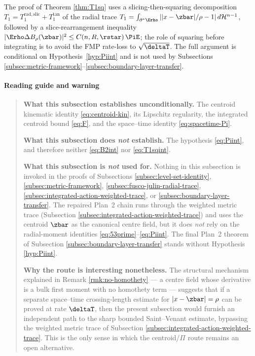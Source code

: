 \noindent
The proof of Theorem \ref{thm:T1sq} uses a slicing-then-squaring
decomposition $T_{1}=T_{1}^{\mathrm{rad,slic}}+T_{1}^{\mathrm{tan}}$
of the radial trace
$T_{1}=\int_{\partial^{*}\Erho}||x-\zbar|/\rho-1|\,d\mathcal H^{n-1}$,
followed by a slice-rearrangement inequality
$|\Erho\Delta B_{\rho}(\zbar)|^{2}\le C(n,R,\rstar)\,\PiE$;
the role of squaring before
integrating is to avoid the FMP rate-loss to $\sqrt{\deltaT}$.
The full argument is conditional on Hypothesis~\ref{hyp:Piint} and is
not used by Subsections
\ref{subsec:metric-framework}--\ref{subsec:boundary-layer-transfer}.

\paragraph{Reading guide and warning}

\begin{quote}\small
\textbf{What this subsection establishes unconditionally.}
The centroid kinematic identity \eqref{eq:centroid-kin}, its
Lipschitz regularity, the integrated centroid bound \eqref{eq:F}, and
the space--time identity \eqref{eq:spacetime-Pi}.

\textbf{What this subsection does \emph{not} establish.}
The hypothesis \eqref{eq:Piint}, and therefore neither
\eqref{eq:B2int} nor \eqref{eq:T1sqint}.

\textbf{What this subsection is \emph{not} used for.}
Nothing in this subsection is invoked in the proofs of
Subsections \ref{subsec:level-set-identity},
\ref{subsec:metric-framework},
\ref{subsec:fusco-julin-radial-trace},
\ref{subsec:integrated-action-weighted-trace}, or
\ref{subsec:boundary-layer-transfer}. The repaired Plan~2 chain runs
through the weighted metric trace
(Subsection \ref{subsec:integrated-action-weighted-trace})
and uses the centroid $\zbar$ as the canonical centre field, but it
does \emph{not} rely on the radial-moment identities
\eqref{eq:53prime}--\eqref{eq:Piint}. The final Plan~2 theorem of
Subsection \ref{subsec:boundary-layer-transfer} stands without
Hypothesis \ref{hyp:Piint}.

\textbf{Why the route is interesting nonetheless.}
The structural mechanism explained in
Remark \ref{rmk:no-homothety} --- a centre field whose
derivative is a bulk first moment with no homothety term ---
suggests that if a separate space--time crossing-length estimate
for $|x-\zbar|=\rho$ can be proved at rate $\deltaT$, then the
present subsection would furnish an independent path to the sharp
bounded Saint--Venant estimate, bypassing the weighted metric trace
of Subsection \ref{subsec:integrated-action-weighted-trace}. This is
the only sense in which the centroid/$\Pi$ route remains an open
alternative.
\end{quote}


